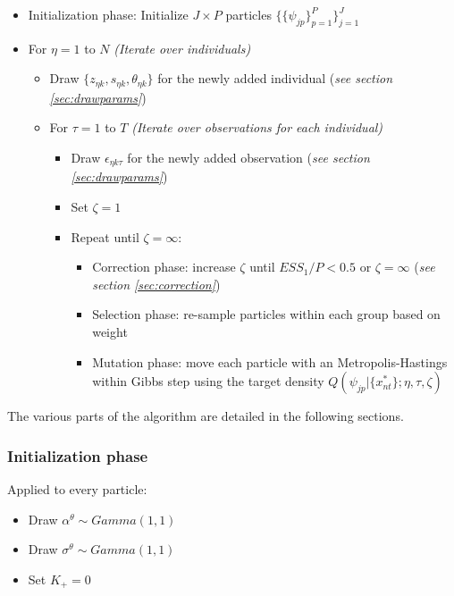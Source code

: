 \documentclass[12pt]{article}
\newcounter{thm}[section]
\begin{document}
\begin{itemize}
	\item Initialization phase: Initialize $J \times P$ particles $\{\{\psi_{jp}\}_{p=1}^P\}_{j=1}^J$
	\item For $\eta=1$ to $N$ {\it (Iterate over individuals)}
	\begin{itemize}
		\item Draw $\{z_{\eta k},s_{\eta k},\theta_{\eta k}\}$ for the newly added individual (\textit{see section \ref{sec:drawparams}})
		\item For $\tau=1$ to $T$ {\it (Iterate over observations for each individual)}
		\begin{itemize}
			\item Draw $\epsilon_{\eta k \tau}$ for the newly added observation (\textit{see section \ref{sec:drawparams}})
			\item Set $\zeta = 1$
			\item Repeat until $\zeta = \infty$:
			\begin{itemize}
				\item Correction phase: increase $\zeta$ until $ESS_1/P<0.5$ or $\zeta=\infty$ (\textit{see section \ref{sec:correction}})
				\item Selection phase: re-sample particles within each group based on weight
				\item Mutation phase: move each particle with an Metropolis-Hastings within Gibbs step using the target density $ Q(\psi_{jp}|\{x_{nt}^*\};\eta,\tau,\zeta) $
			\end{itemize}
		\end{itemize}
	\end{itemize}
\end{itemize}

The various parts of the algorithm are detailed in the following sections.

\subsubsection{Initialization phase}

Applied to every particle:

\begin{itemize}
	\item Draw $\alpha^\theta \sim Gamma(1,1)$
	\item Draw $\sigma^\theta \sim Gamma(1,1)$
	\item Set $K_+ = 0$
\end{itemize}
\end{document}
